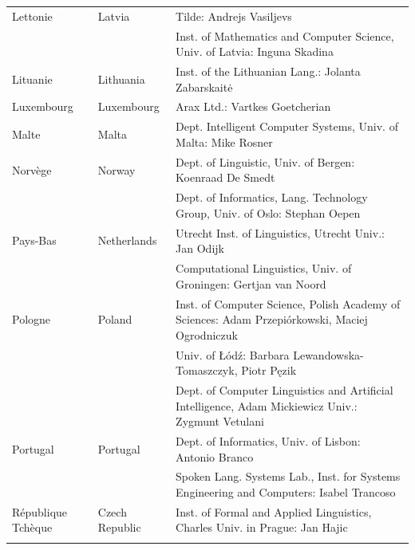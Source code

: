 \begin{longtable}{llp{105mm}}
  Lettonie & \textcolor{grey1}{Latvia} & Tilde: Andrejs Vasiljevs\\ \addlinespace 
  & & Inst. of Mathematics and Computer Science, Univ. of Latvia: Inguna Skadina\\ \addlinespace

  Lituanie & \textcolor{grey1}{Lithuania} & Inst. of the Lithuanian Lang.: Jolanta Zabarskaitė\\ \addlinespace

  Luxembourg & \textcolor{grey1}{Luxembourg} & Arax Ltd.: Vartkes Goetcherian\\ \addlinespace

  Malte & \textcolor{grey1}{Malta} & Dept. Intelligent Computer Systems, Univ. of Malta: Mike Rosner\\ \addlinespace

  Norvège & \textcolor{grey1}{Norway} & Dept. of Linguistic, Univ. of Bergen: Koenraad De Smedt\\ \addlinespace 
  & & Dept. of Informatics, Lang. Technology Group, Univ. of Oslo: Stephan Oepen \\ \addlinespace

  Pays-Bas & \textcolor{grey1}{Netherlands} & Utrecht Inst. of Linguistics, Utrecht Univ.: Jan Odijk\\ \addlinespace 
  & & Computational Linguistics, Univ. of Groningen: Gertjan van Noord\\ \addlinespace

  Pologne & \textcolor{grey1}{Poland} & Inst. of Computer Science, Polish Academy of Sciences: Adam Przepiórkowski, Maciej Ogrodniczuk \\ \addlinespace
  & & Univ. of Łódź: Barbara Lewandowska-Tomaszczyk, Piotr Pęzik\\ \addlinespace
  & & Dept. of Computer Linguistics and Artificial Intelligence, Adam Mickiewicz Univ.: Zygmunt Vetulani \\ \addlinespace

  Portugal & \textcolor{grey1}{Portugal} & Dept. of Informatics, Univ. of Lisbon: Antonio Branco\\ \addlinespace
  & & Spoken Lang. Systems Lab., Inst. for Systems Engineering and Computers: Isabel Trancoso \\ \addlinespace

  République Tchèque& \textcolor{grey1}{Czech Republic} & Inst. of Formal and Applied Linguistics, Charles Univ. in Prague: Jan Hajic \\ \addlinespace


\end{longtable}
